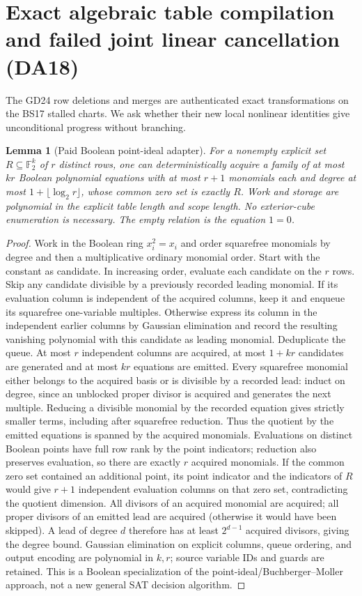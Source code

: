 \documentclass[11pt]{article}
\newtheorem{lemma}[theorem]{Lemma}
\begin{document}
\section{Exact algebraic table compilation and failed joint linear cancellation (DA18)}\label{sec:da18}
The GD24 row deletions and merges are authenticated exact transformations on the BS17 stalled charts. We ask whether their new local nonlinear identities give unconditional progress without branching.
\begin{lemma}[Paid Boolean point-ideal adapter]\label{lem:da18-border}
For a nonempty explicit set $R\subseteq\mathbb F_2^k$ of $r$ distinct rows, one can deterministically acquire a family of at most $kr$ Boolean polynomial equations with at most $r+1$ monomials each and degree at most $1+\lfloor\log_2 r\rfloor$, whose common zero set is exactly $R$. Work and storage are polynomial in the explicit table length and scope length. No exterior-cube enumeration is necessary. The empty relation is the equation $1=0$.
\end{lemma}
\begin{proof}
Work in the Boolean ring $x_i^2=x_i$ and order squarefree monomials by degree and then a multiplicative ordinary monomial order. Start with the constant as candidate. In increasing order, evaluate each candidate on the $r$ rows. Skip any candidate divisible by a previously recorded leading monomial. If its evaluation column is independent of the acquired columns, keep it and enqueue its squarefree one-variable multiples. Otherwise express its column in the independent earlier columns by Gaussian elimination and record the resulting vanishing polynomial with this candidate as leading monomial. Deduplicate the queue. At most $r$ independent columns are acquired, at most $1+kr$ candidates are generated and at most $kr$ equations are emitted. Every squarefree monomial either belongs to the acquired basis or is divisible by a recorded lead: induct on degree, since an unblocked proper divisor is acquired and generates the next multiple. Reducing a divisible monomial by the recorded equation gives strictly smaller terms, including after squarefree reduction. Thus the quotient by the emitted equations is spanned by the acquired monomials. Evaluations on distinct Boolean points have full row rank by the point indicators; reduction also preserves evaluation, so there are exactly $r$ acquired monomials. If the common zero set contained an additional point, its point indicator and the indicators of $R$ would give $r+1$ independent evaluation columns on that zero set, contradicting the quotient dimension. All divisors of an acquired monomial are acquired; all proper divisors of an emitted lead are acquired (otherwise it would have been skipped). A lead of degree $d$ therefore has at least $2^{d-1}$ acquired divisors, giving the degree bound. Gaussian elimination on explicit columns, queue ordering, and output encoding are polynomial in $k,r$; source variable IDs and guards are retained. This is a Boolean specialization of the point-ideal/Buchberger--Moller approach, not a new general SAT decision algorithm.
\end{proof}
\end{document}

